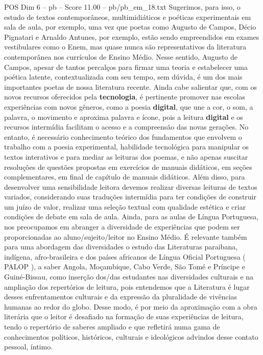 \begin{textsample}{POS Dim 6 – pb – Score 11.00 – pb/pb\_em\_18.txt}
Sugerimos, para isso, o estudo de textos contemporâneos, multimidiáticos e poéticas experimentais em sala de aula, por exemplo, uma vez que poetas como Augusto de Campos, Décio Pignatari e Arnaldo Antunes, por exemplo, estão sendo empreendidos em exames vestibulares como o Enem, mas quase nunca são representativos da literatura contemporânea nos currículos de Ensino Médio.
Nesse sentido, Augusto de Campos, apesar de tantos percalços para firmar uma teoria e estabelecer uma poética latente, contextualizada com seu tempo, sem dúvida, é um dos mais importantes poetas de nossa literatura recente.
Ainda cabe salientar que, com os novos recursos oferecidos pela \textbf{tecnologia}, é pertinente promover nas escolas experiências com novos gêneros, como a poesia \textbf{digital}, que une a cor, o som, a palavra, o movimento e aproxima palavra e ícone, pois a leitura \textbf{digital} e os recursos intermídia facilitam o acesso e a compreensão das novas gerações.
No entanto, é necessário conhecimento teórico dos fundamentos que envolvem o trabalho com a poesia experimental, habilidade tecnológica para manipular os textos interativos e para mediar as leituras dos poemas, e não apenas suscitar resoluções de questões propostas em exercícios de manuais didáticos, em seções complementares, em final de capítulo de manuais didáticos.
Além disso, para desenvolver uma sensibilidade leitora devemos realizar diversas leituras de textos variados, considerando suas traduções intermídia para ter condições de construir um juízo de valor, realizar uma seleção textual com qualidade estética e criar condições de debate em sala de aula.
Ainda, para as aulas de Língua Portuguesa, nos preocupamos em abranger a diversidade de experiências que podem ser proporcionadas ao aluno/sujeito/leitor no Ensino Médio.
É relevante também para uma abordagem das diversidades o estudo das Literaturas paraibana, indígena, afro-brasileira e dos países africanos de Língua Oficial Portuguesa ( PALOP ), a saber Angola, Moçambique, Cabo Verde, São Tomé e Príncipe e Guiné-Bissau, como inserção dos/das estudantes nas diversidades culturais e na ampliação dos repertórios de leitura, pois entendemos que a Literatura é lugar desses enfrentamentos culturais e da expressão da pluralidade de vivências humanas ao redor do globo.
Desse modo, é por meio da aproximação com a obra literária que o leitor é desafiado na formação de suas experiências de leitura, tendo o repertório de saberes ampliado e que refletirá numa gama de conhecimentos políticos, históricos, culturais e ideológicos advindos desse contato pessoal, íntimo.

\end{textsample}
